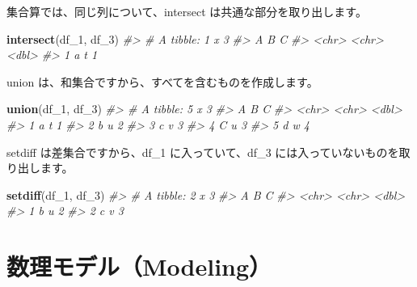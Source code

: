 \documentclass[
  xelatex, ja=standard]{bxjsbook}
\newenvironment{Shaded}{\begin{snugshade}}{\end{snugshade}}
\newcommand{\CommentTok}[1]{\textcolor[rgb]{0.56,0.35,0.01}{\textit{#1}}}
\newcommand{\FunctionTok}[1]{\textcolor[rgb]{0.13,0.29,0.53}{\textbf{#1}}}
\newcommand{\NormalTok}[1]{#1}
\theoremstyle{definition}
\theoremstyle{definition}
\theoremstyle{definition}
\theoremstyle{definition}
\theoremstyle{remark}
\begin{document}
集合算では、同じ列について、intersect は共通な部分を取り出します。

\begin{Shaded}
\begin{Highlighting}[]
\FunctionTok{intersect}\NormalTok{(df\_1, df\_3)}
\CommentTok{\#\textgreater{} \# A tibble: 1 x 3}
\CommentTok{\#\textgreater{}   A     B         C}
\CommentTok{\#\textgreater{}   \textless{}chr\textgreater{} \textless{}chr\textgreater{} \textless{}dbl\textgreater{}}
\CommentTok{\#\textgreater{} 1 a     t         1}
\end{Highlighting}
\end{Shaded}

union は、和集合ですから、すべてを含むものを作成します。

\begin{Shaded}
\begin{Highlighting}[]
\FunctionTok{union}\NormalTok{(df\_1, df\_3)}
\CommentTok{\#\textgreater{} \# A tibble: 5 x 3}
\CommentTok{\#\textgreater{}   A     B         C}
\CommentTok{\#\textgreater{}   \textless{}chr\textgreater{} \textless{}chr\textgreater{} \textless{}dbl\textgreater{}}
\CommentTok{\#\textgreater{} 1 a     t         1}
\CommentTok{\#\textgreater{} 2 b     u         2}
\CommentTok{\#\textgreater{} 3 c     v         3}
\CommentTok{\#\textgreater{} 4 C     u         3}
\CommentTok{\#\textgreater{} 5 d     w         4}
\end{Highlighting}
\end{Shaded}

setdiff は差集合ですから、df\_1 に入っていて、df\_3 には入っていないものを取り出します。

\begin{Shaded}
\begin{Highlighting}[]
\FunctionTok{setdiff}\NormalTok{(df\_1, df\_3)}
\CommentTok{\#\textgreater{} \# A tibble: 2 x 3}
\CommentTok{\#\textgreater{}   A     B         C}
\CommentTok{\#\textgreater{}   \textless{}chr\textgreater{} \textless{}chr\textgreater{} \textless{}dbl\textgreater{}}
\CommentTok{\#\textgreater{} 1 b     u         2}
\CommentTok{\#\textgreater{} 2 c     v         3}
\end{Highlighting}
\end{Shaded}

\hypertarget{modeling}{%
\chapter{数理モデル（Modeling）}\label{modeling}}
\end{document}
